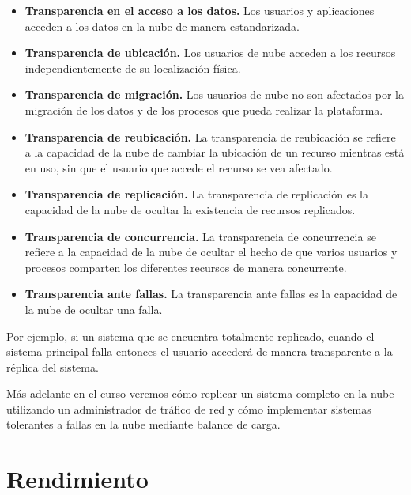 \documentclass[11pt,a4paper,oneside]{book}
\begin{document}
\begin{itemize}

\item \textbf{Transparencia en el acceso a los datos.} Los usuarios y aplicaciones acceden a los datos en la nube de manera estandarizada.

\item \textbf{Transparencia de ubicación.} Los usuarios de nube acceden a los recursos independientemente de su localización física.

\item \textbf{Transparencia de migración.} Los usuarios de nube no son afectados por la migración de los datos y de los procesos que pueda realizar la plataforma.

\item \textbf{Transparencia de reubicación.} La transparencia de reubicación se refiere a la capacidad de la nube de cambiar la ubicación de un recurso mientras está en uso, sin que el usuario que accede el recurso se vea afectado.

\item \textbf{Transparencia de replicación.} La transparencia de replicación es la capacidad de la nube de ocultar la existencia de recursos replicados.

\item \textbf{Transparencia de concurrencia.} La transparencia de concurrencia se refiere a la capacidad de la nube de ocultar el hecho de que varios usuarios y procesos comparten los diferentes recursos de manera concurrente.

\item \textbf{Transparencia ante fallas.} La transparencia ante fallas es la capacidad de la nube de ocultar una falla.

\end{itemize}

Por ejemplo, si un sistema que se encuentra totalmente replicado, cuando el sistema principal falla entonces el usuario accederá de manera transparente a la réplica del sistema.

Más adelante en el curso veremos cómo replicar un sistema completo en la nube utilizando un administrador de tráfico de red y cómo implementar sistemas tolerantes a fallas en la nube mediante balance de carga.

\section{Rendimiento}
\end{document}
